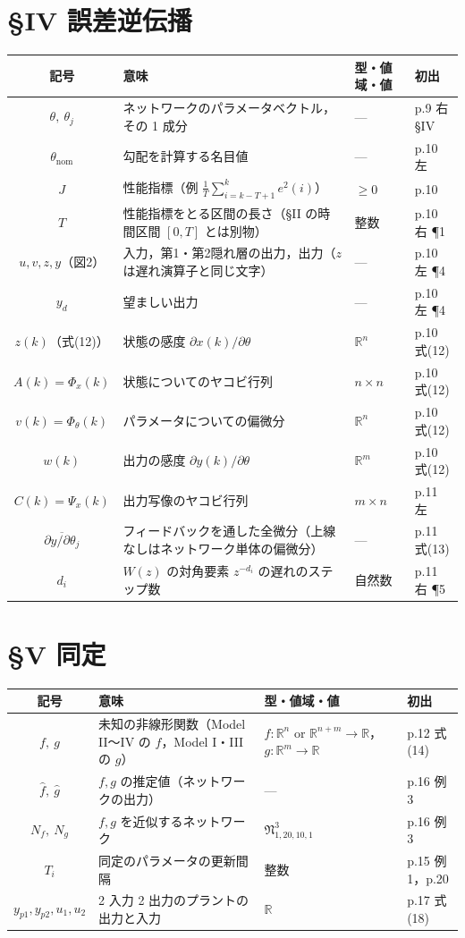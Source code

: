 \documentclass[a4paper,10pt]{ltjsarticle}
\newcommand{\note}[1]{\textcolor{red!70!black}{#1}}
\newenvironment{symtab}{%
  \par\noindent\begin{tabular}{SMTP}
  \toprule
  記号 & 意味 & 型・値域・値 & 初出 \\
  \midrule
}{\bottomrule\end{tabular}\par\medskip}
\begin{document}
\section{§IV 誤差逆伝播}
\begin{symtab}
$\theta,\ \theta_j$ & ネットワークのパラメータベクトル，その 1 成分 & --- & p.9 右 §IV \\
$\theta_{\mathrm{nom}}$ & 勾配を計算する名目値 & --- & p.10 左 \\
$J$ & 性能指標（例 $\frac1T\sum_{i=k-T+1}^k e^2(i)$） & $\ge 0$ & p.10 \\
$T$ & 性能指標をとる区間の長さ\note{（§II の時間区間 $[0,T]$ とは別物）} & 整数 & p.10 右 ¶1 \\
$u,v,z,y$（図2） & 入力，第1・第2隠れ層の出力，出力\note{（$z$ は遅れ演算子と同じ文字）} & --- & p.10 左 ¶4 \\
$y_d$ & 望ましい出力 & --- & p.10 左 ¶4 \\
$z(k)$（式(12)） & 状態の感度 $\partial x(k)/\partial\theta$ & $\mathbb{R}^n$ & p.10 式(12) \\
$A(k)=\Phi_x(k)$ & 状態についてのヤコビ行列 & $n\times n$ & p.10 式(12) \\
$v(k)=\Phi_\theta(k)$ & パラメータについての偏微分 & $\mathbb{R}^n$ & p.10 式(12) \\
$w(k)$ & 出力の感度 $\partial y(k)/\partial\theta$ & $\mathbb{R}^m$ & p.10 式(12) \\
$C(k)=\Psi_x(k)$ & 出力写像のヤコビ行列 & $m\times n$ & p.11 左 \\
$\overline{\partial y/\partial\theta_j}$ & フィードバックを通した全微分（上線なしはネットワーク単体の偏微分） & --- & p.11 式(13) \\
$d_i$ & $W(z)$ の対角要素 $z^{-d_i}$ の遅れのステップ数 & 自然数 & p.11 右 ¶5 \\
\end{symtab}

\section{§V 同定}
\begin{symtab}
$f,\ g$ & 未知の非線形関数（Model II〜IV の $f$，Model I・III の $g$） & $f:\mathbb{R}^n\text{ or }\mathbb{R}^{n+m}\to\mathbb{R}$，$g:\mathbb{R}^m\to\mathbb{R}$ & p.12 式(14) \\
$\hat f,\ \hat g$ & $f,g$ の推定値（ネットワークの出力） & --- & p.16 例3 \\
$N_f,\ N_g$ & $f,g$ を近似するネットワーク & $\mathfrak{N}^3_{1,20,10,1}$ & p.16 例3 \\
$T_i$ & 同定のパラメータの更新間隔 & 整数 & p.15 例1，p.20 \\
$y_{p1},y_{p2},u_1,u_2$ & 2 入力 2 出力のプラントの出力と入力 & $\mathbb{R}$ & p.17 式(18) \\
\end{symtab}
\end{document}
